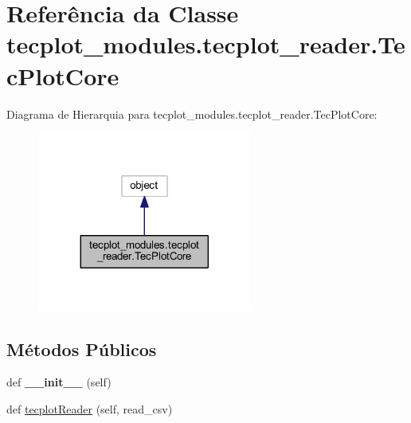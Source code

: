 \hypertarget{a00122}{}\section{Referência da Classe tecplot\+\_\+modules.\+tecplot\+\_\+reader.\+Tec\+Plot\+Core}
\label{a00122}


Diagrama de Hierarquia para tecplot\+\_\+modules.\+tecplot\+\_\+reader.\+Tec\+Plot\+Core\+:
\nopagebreak
\begin{figure}[H]
\begin{center}
\leavevmode
\includegraphics[width=200pt]{a00121}
\end{center}
\end{figure}
\subsection*{Métodos Públicos}
\begin{DoxyCompactItemize}
\item 
\hypertarget{a00122_a15954180c0b4a9677efd980873a91773}{}\label{a00122_a15954180c0b4a9677efd980873a91773} 
def {\bfseries \+\_\+\+\_\+init\+\_\+\+\_\+} (self)
\item 
def \hyperlink{a00122_a9cf438934b57cd1d0bef90bcc00f27ac}{tecplot\+Reader} (self, read\+\_\+csv)
\end{DoxyCompactItemize}
